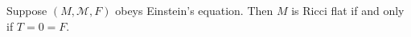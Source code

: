 Suppose $(M, \mathcal{M}, F)$ obeys Einstein's equation. Then $M$ is Ricci flat if and only if $T = 0 = F$.
